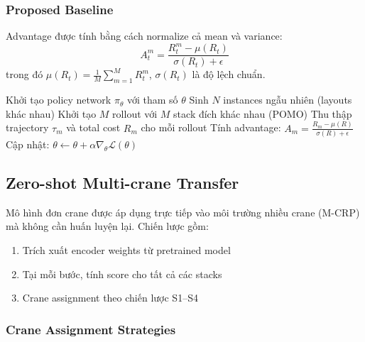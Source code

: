 \documentclass[11pt,a4paper]{article}
\theoremstyle{definition}
\begin{document}
\subsubsection{Proposed Baseline}

Advantage được tính bằng cách normalize cả mean và variance:
\begin{equation}
    A_t^m = \frac{R_t^m - \mu(R_t)}{\sigma(R_t) + \epsilon}
\end{equation}
trong đó $\mu(R_t) = \frac{1}{M}\sum_{m=1}^M R_t^m$, $\sigma(R_t)$ là độ lệch chuẩn.

\begin{algorithm}[h!]
    \caption{Huấn luyện với REINFORCE + Proposed Baseline}
    \begin{algorithmic}[1]
        \State Khởi tạo policy network $\pi_\theta$ với tham số $\theta$
                \State Sinh $N$ instances ngẫu nhiên (layouts khác nhau)
                    \State Khởi tạo $M$ rollout với $M$ stack đích khác nhau (POMO)
                    \State Thu thập trajectory $\tau_m$ và total cost $R_m$ cho mỗi rollout
                \EndFor
                \State Tính advantage: $A_m = \frac{R_m - \mu(R)}{\sigma(R) + \epsilon}$
                \State Cập nhật: $\theta \leftarrow \theta + \alpha \nabla_\theta \mathcal{L}(\theta)$
            \EndFor
        \EndFor
    \end{algorithmic}
\end{algorithm}

\subsection{Zero-shot Multi-crane Transfer}

Mô hình đơn crane được áp dụng trực tiếp vào môi trường nhiều crane (M-CRP) mà không cần huấn luyện lại. Chiến lược gồm:

\begin{enumerate}
    \item Trích xuất encoder weights từ pretrained model
    \item Tại mỗi bước, tính score cho tất cả các stacks
    \item Crane assignment theo chiến lược S1--S4
\end{enumerate}

\subsubsection{Crane Assignment Strategies}
\end{document}
